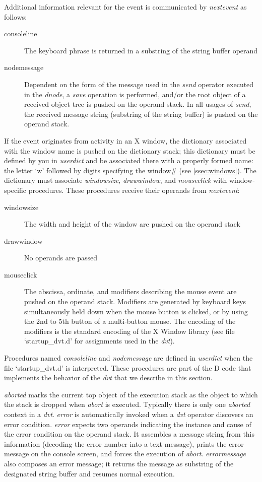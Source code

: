 Additional information relevant for the event is communicated by \emph{nextevent} as follows:

\begin{description}
\item[consoleline] The keyboard phrase is returned in a substring of the string buffer operand
\item[nodemessage] Dependent on the form of the message used in the \emph{send} operator executed in the \emph{dnode}, a \emph{save} operation is performed, and/or the root object of a received object tree is pushed on the operand stack. In all usages of \emph{send}, the received message string (substring of the string buffer) is pushed on the operand stack. 
\end{description}

\noindent If the event originates from activity in an X window, the dictionary associated with the window name is pushed on the dictionary stack; this dictionary must be defined by you in \emph{userdict} and be associated there with a properly formed name: the letter `w' followed by digits specifying the window\# (see \ref{ssec:windows}). The dictionary must associate \emph{windowsize}, \emph{drawwindow}, and \emph{mouseclick} with window-specific procedures. These procedures receive their operands from \emph{nextevent}:  

\begin{description}
\item[windowsize] The width and height of the window are pushed on the operand stack
\item[drawwindow] No operands are passed 
\item[mouseclick] The abscissa, ordinate, and modifiers describing the mouse event are pushed on the operand stack. Modifiers are generated by keyboard keys simultaneously held down when the mouse button is clicked, or by using the 2nd to 5th button of a multi-button mouse. The encoding of the modifiers is the standard encoding of the X Window library (see file `startup\_dvt.d' for assignments used in the \emph{dvt}).
\end{description}

Procedures named \emph{consoleline} and \emph{nodemessage} are defined in \emph{userdict} when the file `startup\_dvt.d' is interpreted. These procedures are part of the D  code that implements the behavior of the \emph{dvt} that we describe in this section.

\emph{aborted} marks the current top object of the execution stack as the object to which the stack is dropped when \emph{abort} is executed. Typically there is only one \emph{aborted} context in a \emph{dvt}. \emph{error} is automatically invoked when a \emph{dvt} operator discovers an error condition. \emph{error} expects two operands indicating the instance and cause of the error condition on the operand stack. It assembles a message string from this information (decoding the error number into a text message), prints the error message on the console screen, and forces the execution of \emph{abort}. \emph{errormessage} also composes an error message; it returns the message as substring of the designated string buffer and resumes normal execution.

